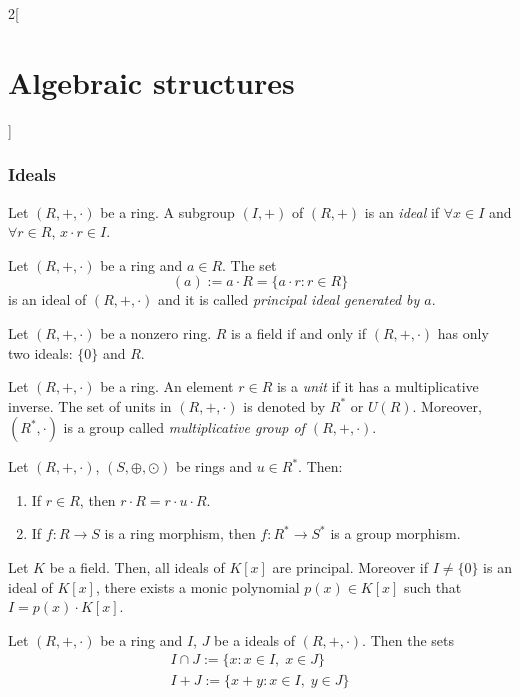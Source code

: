 \documentclass[../../../main.tex]{subfiles}
\begin{document}
\begin{multicols}{2}[\section{Algebraic structures}]
    \subsubsection{Ideals}
    \begin{definition}[Ideal]
        Let $(R,+,\cdot)$ be a ring. A subgroup $(I,+)$ of $(R,+)$ is an \textit{ideal} if $\forall x\in I$ and $\forall r\in R$, $x\cdot r\in I$.
    \end{definition}
    \begin{lemma}
        Let $(R,+,\cdot)$ be a ring and $a\in R$. The set $$(a):=a\cdot R=\{a\cdot r:r\in R\}$$ is an ideal of $(R,+,\cdot)$ and it is called \textit{principal ideal generated by $a$}.
    \end{lemma}
    \begin{prop}
        Let $(R,+,\cdot)$ be a nonzero ring. $R$ is a field if and only if $(R,+,\cdot)$ has only two ideals: $\{0\}$ and $R$.
    \end{prop}
    \begin{definition}
        Let $(R,+,\cdot)$ be a ring. An element $r\in R$ is a \textit{unit} if it has a multiplicative inverse. The set of units in $(R,+,\cdot)$ is denoted by $R^*$ or $U(R)$. Moreover, $(R^*,\cdot)$ is a group called \textit{multiplicative group of $(R,+,\cdot)$}.
    \end{definition}
    \begin{lemma}
        Let $(R,+,\cdot)$, $(S,\oplus,\odot)$ be rings and $u\in R^*$. Then:
        \begin{enumerate}
            \item If $r\in R$, then $r\cdot R=r\cdot u\cdot R$.
            \item If $f:R\rightarrow S$ is a ring morphism, then $f:R^*\rightarrow S^*$ is a group morphism.
        \end{enumerate}
    \end{lemma}
    \begin{prop}
        Let $K$ be a field. Then, all ideals of $K[x]$ are principal. Moreover if $I\ne\{0\}$ is an ideal of $K[x]$, there exists a monic polynomial $p(x)\in K[x]$ such that $I=p(x)\cdot K[x]$.
    \end{prop}
    \begin{prop}
        Let $(R,+,\cdot)$ be a ring and $I$, $J$ be a ideals of $(R,+,\cdot)$. Then the sets
        \begin{gather*}
            I\cap J:=\{x:x\in I,\;x\in J\}\\
            I+J:=\{x+y:x\in I,\;y\in J\}\\

\end{gather*}
\end{prop}
\end{multicols}
\end{document}
